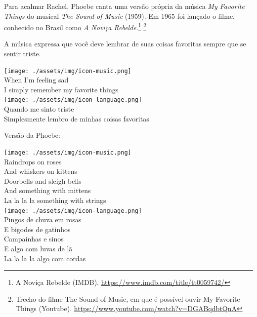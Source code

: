 Para acalmar Rachel, Phoebe canta uma versão própria da música \emph{My
Favorite Things} do musical \emph{The Sound of Music} (1959). Em 1965
foi lançado o filme, conhecido no Brasil como \emph{A Noviça
Rebelde}.\footnote{\sloppy A Noviça Rebelde (IMDB). \url{https://www.imdb.com/title/tt0059742/}}
\footnote{\sloppy Trecho do filme The Sound of Music, em que é possível ouvir My Favorite Things (Youtube). \url{https://www.youtube.com/watch?v=DGABqdbtQnA}}

A música expressa que você deve lembrar de suas coisas favoritas sempre
que se sentir triste.

\bigskip
\begin{tcolorbox}[enhanced,
    drop fuzzy shadow southeast, boxrule=0.3pt,
    lower separated=false, sidebyside, sidebyside align=top,
    halign=flush right, halign lower=left, breakable,
    colframe=black!30!dialogoBorder,colback=musicaBg]
\texttt{[image: ./assets/img/icon-music.png]}\\
When I’m feeling sad\\I simply remember my favorite things\\
\tcblower
\texttt{[image: ./assets/img/icon-language.png]}\\
Quando me sinto triste\\Simplesmente lembro de minhas coisas favoritas\\
\end{tcolorbox}

Versão da Phoebe:

\bigskip
\begin{tcolorbox}[enhanced,
    drop fuzzy shadow southeast, boxrule=0.3pt,
    lower separated=false, sidebyside, sidebyside align=top,
    halign=flush right, halign lower=left, breakable,
    colframe=black!30!dialogoBorder,colback=musicaBg]
\texttt{[image: ./assets/img/icon-music.png]}\\
Raindrops on roses\\And whiskers on kittens\\Doorbells and sleigh bells\\And something with mittens\\La la la la something with strings\\
\tcblower
\texttt{[image: ./assets/img/icon-language.png]}\\
Pingos de chuva em rosas\\E bigodes de gatinhos\\Campainhas e sinos\\E algo com luvas de lã\\La la la la algo com cordas\\
\end{tcolorbox}

